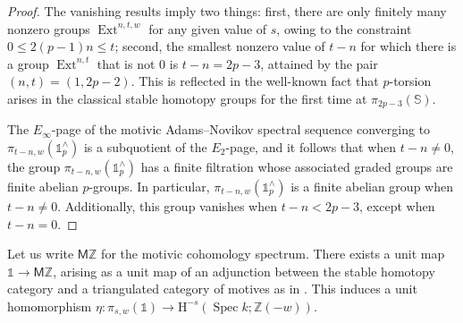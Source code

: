 \documentclass[11pt, oneside, dvipsnames, svgnames, table, final]{amsart}
\newcommand{\mathbx}[1]{\mathbb{#1}}
\theoremstyle{plain}
\theoremstyle{definition}
\theoremstyle{remark}
\newcommand{\Z}{\mathbx{Z}}
\newcommand{\Ext}{\operatorname{Ext}}
\newcommand{\spec}{\operatorname{Spec}}
\newcommand{\Spec}{\spec}
\newcommand{\Hoh}{\mathrm{H}}
\newcommand{\<}[1]{{\langle}#1 {\rangle}}
\newcommand{\MZ}{\mathsf{M}\Z}
\newcommand{\one}{\mathbb{1}}
\newcommand{\SpS}{\mathbb{S}}
\begin{document}
\begin{proof}
 The vanishing results imply two things: first, there are only finitely many nonzero groups $\Ext^{n,t,w}$ for any given value of $s$, owing to the constraint $0 \le 2(p-1)n \le t$; second, the smallest nonzero value of $t-n$ for which there is a group $\Ext^{n,t}$ that is not $0$ is $t-n=2p-3$, attained by the pair $(n,t) = (1,2p-2)$. This is reflected in the well-known fact that $p$-torsion arises in the classical stable homotopy groups for the first time at $\pi_{2p-3}(\SpS)$.

  The $E_\infty$-page of the motivic Adams--Novikov spectral sequence converging to $\pi_{t-n,w}(\one^\wedge_p)$ is a subquotient of the $E_2$-page, and it follows that when $t-n \neq 0$, the group $\pi_{t-n,w}(\one^\wedge_p)$ has a finite filtration whose associated graded groups are finite abelian $p$-groups. In particular, $\pi_{t-n,w}(\one^\wedge_p)$ is a finite abelian group when $t-n\neq 0$. Additionally, this group vanishes when $ t-n < 2p-3$, except when $t-n=0$.
\end{proof}

Let us write $\MZ$ for the motivic cohomology spectrum. There exists a unit map $\one \to \MZ$, arising as a unit map of an adjunction between the stable homotopy category and a triangulated category of motives as in \cite[\S 5.3.35]{Cisinski2019}. This induces a unit homomorphism $\eta: \pi_{s,w}(\one) \to \Hoh^{-s}(\Spec k; \Z(-w))$. 
\end{document}
